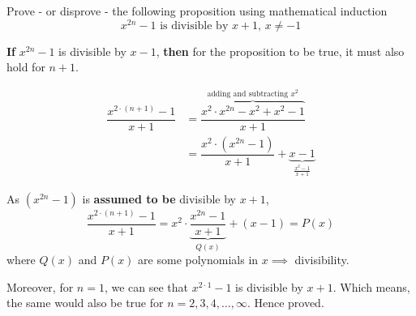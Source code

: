 
\question Prove - or disprove - the following proposition using mathematical induction 
\[ x^{2n} - 1 \text{ is divisible by } x + 1,\, x\neq -1 \]

\insertQR{}

\begin{solution}
  \textbf{If} $x^{2n}-1$ is divisible by $x-1$, \textbf{then} for the proposition to be 
  true, it must also hold for $n+1$. 

  \begin{align}
    \dfrac{x^{2\cdot(n+1)}-1}{x+1} &= \overbrace{\dfrac{x^2\cdot x^{2n} - x^2 + x^2 - 1}{x+1}}^{\text{adding and subtracting $x^2$}} \\
    &= \dfrac{x^2\cdot (x^{2n} - 1)}{x+1} + \underbrace{x-1}_{\frac{x^2-1}{x+1}}
  \end{align}

  As $(x^{2n}-1)$ is \textbf{assumed to be} divisible by $x+1$, 
  \[ \dfrac{x^{2\cdot (n+1)} - 1}{x + 1} = x^2\cdot\underbrace{\dfrac{x^{2n}-1}{x+1}}_{Q(x)} + (x-1) = P(x)\]
  where $Q(x)$ and $P(x)$ are some polynomials in $x\implies$ divisibility.

  Moreover, for $n=1$, we can see that $x^{2\cdot 1}-1$ is divisible by $x+1$. Which means, 
  the same would also be true for $n=2,3,4,\ldots,\infty$. Hence proved.
\end{solution}
